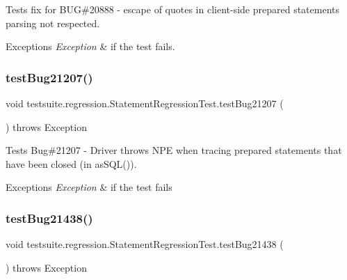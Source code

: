 Tests fix for B\+UG\#20888 -\/ escape of quotes in client-\/side prepared statements parsing not respected.


\begin{DoxyExceptions}{Exceptions}
{\em Exception} & if the test fails. \\
\hline
\end{DoxyExceptions}
\mbox{\label{classtestsuite_1_1regression_1_1_statement_regression_test_a16c4c52784a96bfcf47397ce9a1d0efb}} 
\subsubsection{\texorpdfstring{test\+Bug21207()}{testBug21207()}}
{\footnotesize\ttfamily void testsuite.\+regression.\+Statement\+Regression\+Test.\+test\+Bug21207 (\begin{DoxyParamCaption}{ }\end{DoxyParamCaption}) throws Exception}

Tests Bug\#21207 -\/ Driver throws N\+PE when tracing prepared statements that have been closed (in as\+S\+Q\+L()).


\begin{DoxyExceptions}{Exceptions}
{\em Exception} & if the test fails \\
\hline
\end{DoxyExceptions}
\mbox{\label{classtestsuite_1_1regression_1_1_statement_regression_test_a47c163cd72fcd1b2cf392941cd2b074c}} 
\subsubsection{\texorpdfstring{test\+Bug21438()}{testBug21438()}}
{\footnotesize\ttfamily void testsuite.\+regression.\+Statement\+Regression\+Test.\+test\+Bug21438 (\begin{DoxyParamCaption}{ }\end{DoxyParamCaption}) throws Exception}

